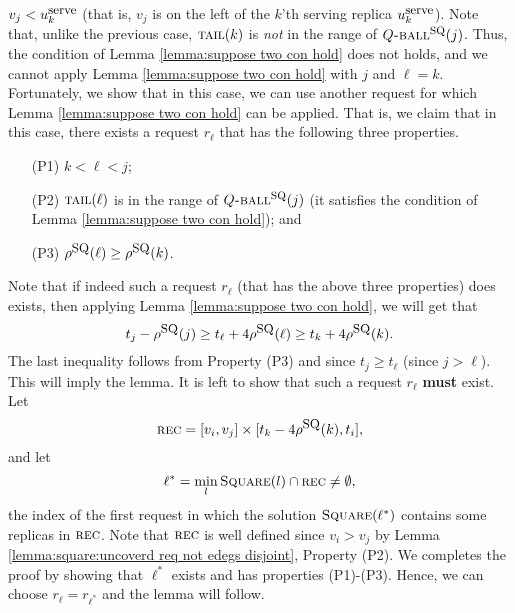 \documentclass[11pt]{article}
\newcommand{\Square}[0]{\mbox{\sc Square}}
\newcommand{\rr}{r}
\newcommand{\uSQ}{u^{\mbox{\small\upshape serve}}}
\newcommand{\tail}[0]{\mbox{\sc tail}}
\newcommand{\rhoSQ}[0]{\rho^{\mbox{\small\upshape SQ}}}
\newcommand{\reck}[0]{\mbox{\sc rec}}
\newcommand{\SQball}[0]{Q{\mbox{\sc -ball}}^{\mbox{\sc sq}}}
\begin{document}
 $v_j<\uSQ_k$ (that is, $v_j$ is on the left of the $k$'th serving replica $\uSQ_k$).
Note that, unlike the previous case, $\tail(k)$ is {\em not} in the range of $\SQball(j)$.
Thus, the condition of Lemma \ref{lemma:suppose two con hold} does not holds,
and we cannot apply Lemma \ref{lemma:suppose two con hold} with $j$ and $\ell=k$.
Fortunately, we show that in this case, we can use another request for which Lemma \ref{lemma:suppose two con hold} can be applied.
That is, we claim that
in this case, there exists  a request $\rr_\ell$ that has the following three properties.
\begin{enumerate}
\item [(P1)] $k<\ell<j$;

\item [(P2)] $\tail(\ell)$ is in the range of $\SQball(j)$ (it satisfies the condition of Lemma  \ref{lemma:suppose two con hold}); and

\item [(P3)] $\rhoSQ(\ell)\geq\rhoSQ(k)$.

\end{enumerate}
Note that if indeed such a request $\rr_\ell$ (that has the above three properties) does exists,
then
applying Lemma \ref{lemma:suppose two con hold},
we will get that
$$
t_j-\rhoSQ(j)\geq t_\ell+4\rhoSQ(\ell)\geq t_k+4\rhoSQ(k).
$$
The last inequality follows from Property (P3) and since $t_j\geq t_\ell$ (since $j>\ell$).
This will imply the lemma.
It is left to show that such a request $\rr_\ell$ {\bf must} exist.
Let
$$\reck=[v_i,v_j]\times[t_k-4\rhoSQ(k), t_i],$$
and let
$$\ell^*= \min_l \Square(l)\cap\reck\not=\emptyset,$$
the index of the first request in which the solution $\Square(\ell^*)$ contains some replicas in $\reck$.
Note that $\reck$ is well defined since $v_i>v_j$ by Lemma \ref{lemma:square:uncoverd req not edegs disjoint}, Property (P2).
We completes the proof by showing
that  $\ell^*$ exists and has  properties (P1)-(P3).
Hence, we can choose $r_\ell=r_{\ell^*}$ and the lemma will follow.
\end{document}
